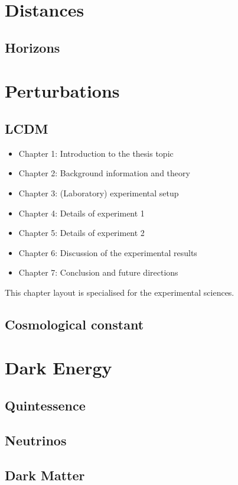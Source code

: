 \section{Distances}



\subsection{Horizons}




\section{Perturbations}

\subsection{LCDM}


\begin{itemize}
\item Chapter 1: Introduction to the thesis topic
\item Chapter 2: Background information and theory
\item Chapter 3: (Laboratory) experimental setup
\item Chapter 4: Details of experiment 1
\item Chapter 5: Details of experiment 2
\item Chapter 6: Discussion of the experimental results
\item Chapter 7: Conclusion and future directions
\end{itemize}
This chapter layout is specialised for the experimental sciences.



\subsection{Cosmological constant}







\section{Dark Energy}





\subsection{Quintessence}




\subsection{Neutrinos}


\subsection{Dark Matter}

